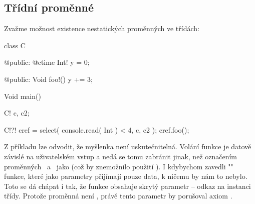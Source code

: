 \subsection{Třídní \ctime proměnné}
Zvažme možnost existence nestatických \ctime proměnných ve třídách:

\begin{code}
class C {
	
@public:
	@ctime Int! y = 0;
	
@public:
	Void foo!() {
		y += 3;
	}
	
}

Void main() {
	C! c, c2;
	
	C!?! cref = select( console.read( Int ) < 4, c, c2 );
	cref.foo();
}
\end{code}

Z příkladu lze odvodit, že myšlenka není uskutečnitelná. Volání funkce  je datově závislé na uživatelském vstup a nedá se tomu zabránit jinak, než označením proměnných ~a~ jako \ctime (což by znemožnilo použití ). I kdybychom zavedli "\ctimeNoXSpace" funkce, které jako parametry přijímají pouze \ctime data, k ničemu by nám to nebylo. Toto se dá chápat i tak, že funkce  obsahuje skrytý parametr -- odkaz na instanci třídy. Protože proměnná  není \ctime, právě tento parametr by porušoval axiom \ctime.


